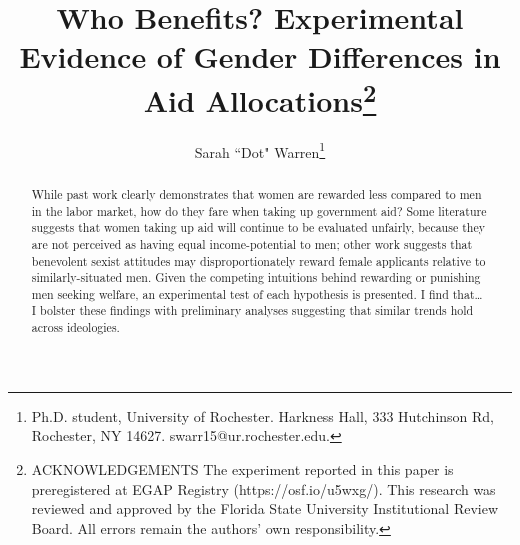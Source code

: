 \documentclass[12pt]{article}%
\author{Sarah ``Dot" Warren\thanks{Ph.D. student, University of Rochester. Harkness Hall, 333 Hutchinson Rd, Rochester, NY 14627. swarr15@ur.rochester.edu.}}
\title{Who Benefits? Experimental Evidence of Gender Differences in Aid Allocations\thanks{ACKNOWLEDGEMENTS The experiment reported in this paper is preregistered at EGAP Registry (https://osf.io/u5wxg/).
This research was reviewed and approved by the Florida State University Institutional Review Board. All errors remain the authors' own responsibility.}}
\begin{document}
\maketitle
\thispagestyle{empty}


\begin{abstract}
While past work clearly demonstrates that women are rewarded less compared to men in the labor market, how do they fare when taking up government aid? Some literature suggests that women taking up aid will continue to be evaluated unfairly, because they are not perceived as having equal income-potential to men; other work suggests that benevolent sexist attitudes may disproportionately reward female applicants relative to similarly-situated men. Given the competing intuitions behind rewarding or punishing men seeking welfare, an experimental test of each hypothesis is presented. I find that…
I bolster these findings with preliminary analyses suggesting that similar trends hold across ideologies.
\end{abstract}



\newpage
\end{document}
